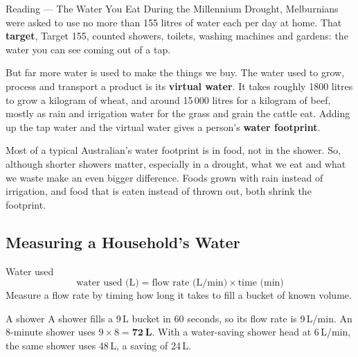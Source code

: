 \begin{readingbox}{Reading --- The Water You Eat}
During the Millennium Drought, Melburnians were asked to use no more than 155 litres of water each per day at home. That \textbf{target}, Target 155, counted showers, toilets, washing machines and gardens: the water you can see coming out of a tap.

But far more water is used to make the things we buy. The water used to grow, process and transport a product is its \textbf{virtual water}. It takes roughly 1800 litres to grow a kilogram of wheat, and around 15\,000 litres for a kilogram of beef, mostly as rain and irrigation water for the grass and grain the cattle eat. Adding up the tap water and the virtual water gives a person's \textbf{water footprint}.

Most of a typical Australian's water footprint is in food, not in the shower. So, although shorter showers matter, especially in a drought, what we eat and what we waste make an even bigger difference. Foods grown with rain instead of irrigation, and food that is eaten instead of thrown out, both shrink the footprint.
\end{readingbox}

\rcreset
{}

\label{theory:3}

\subsection{Measuring a Household's Water}\label{sub:a3.1}

\begin{skillbox}{Water used}
\[ \text{water used (L)} = \text{flow rate (L/min)} \times \text{time (min)} \]
Measure a flow rate by timing how long it takes to fill a bucket of known volume.
\end{skillbox}

\begin{workedex}{A shower}
A shower fills a 9\,L bucket in 60 seconds, so its flow rate is 9\,L/min. An 8-minute shower uses $9 \times 8 = \mathbf{72\ L}$. With a water-saving shower head at 6\,L/min, the same shower uses 48\,L, a saving of 24\,L.
\end{workedex}

